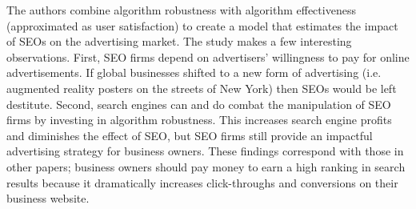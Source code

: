 \documentclass[../summaries.tex]{subfiles}
\begin{document}
The authors combine algorithm robustness with algorithm effectiveness (approximated as user satisfaction) to create a model that estimates the impact of SEOs on the advertising market. The study makes a few interesting observations. First, SEO firms depend on advertisers' willingness to pay for online advertisements. If global businesses shifted to a new form of advertising (i.e. augmented reality posters on the streets of New York) then SEOs would be left destitute. Second, search engines can and do combat the manipulation of SEO firms by investing in algorithm robustness. This increases search engine profits and diminishes the effect of SEO, but SEO firms still provide an impactful advertising strategy for business owners. These findings correspond with those in other papers; business owners should pay money to earn a high ranking in search results because it dramatically increases click-throughs and conversions on their business website.
\end{document}

